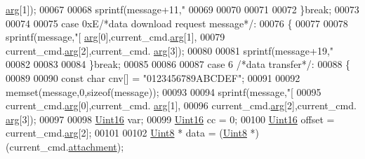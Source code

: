 \begin{DoxyCode}
{      \hyperlink{a00001_a56e6c2d7315d0ae60a51e8b140c9cfe4}{arg}[1]);
00067 
00068        sprintf(message+11,\textcolor{stringliteral}{"%
00069 
00070 
00071 
00072        \}\textcolor{keywordflow}{break};
00073        
00074        
00075        \textcolor{keywordflow}{case} 0xE\textcolor{comment}{/*data download request message*/}:
00076        \{
00077     
00078        sprintf(message,\textcolor{stringliteral}{"[%
      \hyperlink{a00001_a56e6c2d7315d0ae60a51e8b140c9cfe4}{arg}[0],current\_cmd.\hyperlink{a00001_a56e6c2d7315d0ae60a51e8b140c9cfe4}{arg}[1],
00079                                                  current\_cmd.\hyperlink{a00001_a56e6c2d7315d0ae60a51e8b140c9cfe4}{arg}[2],current\_cmd.
      \hyperlink{a00001_a56e6c2d7315d0ae60a51e8b140c9cfe4}{arg}[3]);
00080     
00081        sprintf(message+19,\textcolor{stringliteral}{"%
00082 
00083     
00084        \}\textcolor{keywordflow}{break};
00085 
00086 
00087        \textcolor{keywordflow}{case} 6 \textcolor{comment}{/*data transfer*/}:
00088        \{
00089 
00090        \textcolor{keyword}{const} \textcolor{keywordtype}{char} cnv[] = \textcolor{stringliteral}{"0123456789ABCDEF"};
00091 
00092        memset(message,0,\textcolor{keyword}{sizeof}(message));
00093 
00094        sprintf(message,\textcolor{stringliteral}{"[%
00095                                             current\_cmd.\hyperlink{a00001_a56e6c2d7315d0ae60a51e8b140c9cfe4}{arg}[0],current\_cmd.
      \hyperlink{a00001_a56e6c2d7315d0ae60a51e8b140c9cfe4}{arg}[1],
00096                                             current\_cmd.\hyperlink{a00001_a56e6c2d7315d0ae60a51e8b140c9cfe4}{arg}[2],current\_cmd.
      \hyperlink{a00001_a56e6c2d7315d0ae60a51e8b140c9cfe4}{arg}[3]);
00097 
00098        \hyperlink{a00001_aae7407b021d43f7193a81a58cfb3e297}{Uint16} var;
00099        \hyperlink{a00001_aae7407b021d43f7193a81a58cfb3e297}{Uint16} cc = 0;
00100        \hyperlink{a00001_aae7407b021d43f7193a81a58cfb3e297}{Uint16} offset = current\_cmd.\hyperlink{a00001_a56e6c2d7315d0ae60a51e8b140c9cfe4}{arg}[2];
00101 
00102        \hyperlink{a00001_a979e3e23b9a449e69ab6a8a83b6042f8}{Uint8} * data = (\hyperlink{a00001_a979e3e23b9a449e69ab6a8a83b6042f8}{Uint8} *)(current\_cmd.\hyperlink{a00001_a0b844fe783d7e252159a9641b949e83c}{attachment});
}}}}}
\end{DoxyCode}

